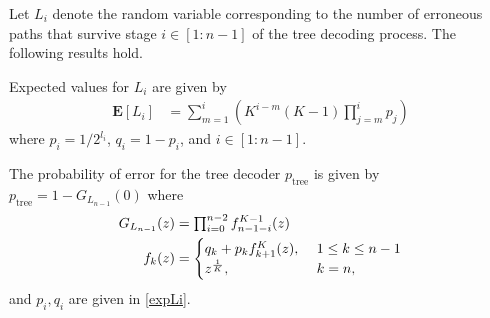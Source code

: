 \documentclass{article}
\newif\ifproof
\begin{document}

Let $L_i$ denote the random variable corresponding to the number of erroneous paths that survive stage $i \in[1:n-1]$ of the tree decoding process.
The following results hold.
\begin{lemma} \label{Lemma1}
Expected values for $L_i$ are given by
\begin{align} \label{expLi}
\mathbf{E}[L_{i}] &= \sum_{m=1}^{i} \left( K^{i-m}(K-1)
\textstyle \prod_{j=m}^{i}p_j \right)
\end{align}
where $p_i ={1}/{2^{l_i}}$, $q_i= 1-p_i$, and $i \in [1:n-1]$.
\end{lemma}
\begin{lemma} \label{Lemma2}
The probability of error for the tree decoder $p_{\mathrm{tree}}$ is given by
$p_{\mathrm{tree}} = 1-G_{L_{n-1}}(0)$ where
\begin{align}
G_{L_{n-1}}(z) &= \textstyle \prod_{i=0}^{n-2} f_{n-1-i}^{K-1}(z) \notag \\
f_k(z) &= \begin{cases}
    q_k + p_k f_{k+1}^{K}(z),& ~1 \le k \le n-1 \\
    z^{\frac{1}{K}},              & ~k=n,
\end{cases} \label{ptree}
\end{align}
and $p_i, q_i$ are given in \eqref{expLi}.
\end{lemma}
\begin{comment}
\begin{proof}
\end{proof}
\end{comment}
\ifproof
\end{document}
